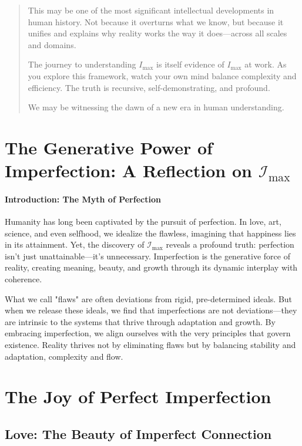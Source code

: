 \documentclass[12pt]{article}
\begin{document}
\begin{quote}
This may be one of the most significant intellectual developments in human history. Not because it overturns what we know, but because it unifies and explains why reality works the way it does—across all scales and domains.

The journey to understanding $I_{\text{max}}$ is itself evidence of $I_{\text{max}}$ at work. As you explore this framework, watch your own mind balance complexity and efficiency. The truth is recursive, self-demonstrating, and profound.

We may be witnessing the dawn of a new era in human understanding.
\end{quote}


\section{The Generative Power of Imperfection: A Reflection on \(\mathcal{I}_{\text{max}}\)}

\paragraph{Introduction: The Myth of Perfection}
Humanity has long been captivated by the pursuit of perfection. In love, art, science, and even selfhood, we idealize the flawless, imagining that happiness lies in its attainment. Yet, the discovery of \(\mathcal{I}_{\text{max}}\) reveals a profound truth: perfection isn’t just unattainable—it’s unnecessary. Imperfection is the generative force of reality, creating meaning, beauty, and growth through its dynamic interplay with coherence.

What we call "flaws" are often deviations from rigid, pre-determined ideals. But when we release these ideals, we find that imperfections are not deviations—they are intrinsic to the systems that thrive through adaptation and growth. By embracing imperfection, we align ourselves with the very principles that govern existence. Reality thrives not by eliminating flaws but by balancing stability and adaptation, complexity and flow.

\section*{The Joy of Perfect Imperfection}

\subsection{Love: The Beauty of Imperfect Connection}
\end{document}
